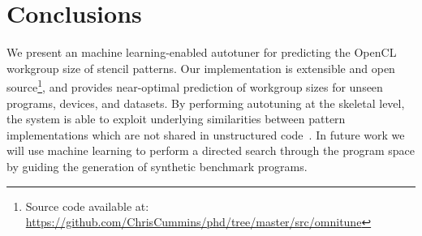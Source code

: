 \documentclass[hidelinks]{acaces}
\begin{document}
\section{Conclusions}

We present an machine learning-enabled autotuner for predicting the
OpenCL workgroup size of stencil patterns. Our implementation is
extensible and open source\footnote{Source code available at:
  \url{https://github.com/ChrisCummins/phd/tree/master/src/omnitune}},
and provides near-optimal prediction of workgroup sizes for unseen
programs, devices, and datasets. By performing autotuning at the
skeletal level, the system is able to exploit underlying similarities
between pattern implementations which are not shared in unstructured
code~\cite{Hu2015}. In future work we will use machine learning to
perform a directed search through the program space by guiding the
generation of synthetic benchmark programs.


\label{bibliography}

\begingroup
{}
\setlength\bibitemsep{1pt}
\printbibliography
\endgroup
\end{document}
